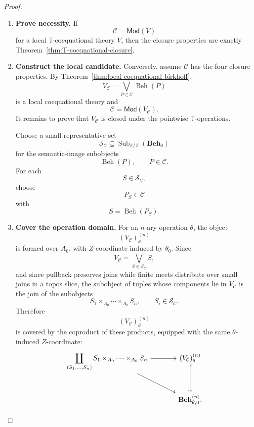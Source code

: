 \begin{proof}
    \leavevmode
    \begin{enumerate}
        \item \textbf{Prove necessity.}
        If
        \[
            \mathcal C=\mathsf{Mod}(V)
        \]
        for a local \(\mathbb T\)-coequational theory \(V\), then the closure
        properties are exactly Theorem~\ref{thm:T-coequational-closure}.

        \item \textbf{Construct the local candidate.}
        Conversely, assume \(\mathcal C\) has the four closure properties. By
        Theorem~\ref{thm:local-coequational-birkhoff},
        \[
            V_{\mathcal C}
            =
            \bigvee_{P\in\mathcal C}\operatorname{Beh}(P)
        \]
        is a local coequational theory and
        \[
            \mathcal C=\mathsf{Mod}(V_{\mathcal C}).
        \]
        It remains to prove that \(V_{\mathcal C}\) is closed under the
        pointwise \(\mathbb T\)-operations.

        Choose a small representative set
        \[
            \mathcal S_{\mathcal C}
            \subseteq
            \operatorname{Sub}_{\mathcal E/Z}(\mathbf{Beh}_0)
        \]
        for the semantic-image subobjects
        \[
            \operatorname{Beh}(P),
            \qquad
            P\in\mathcal C.
        \]
        For each
        \[
            S\in\mathcal S_{\mathcal C},
        \]
        choose
        \[
            P_S\in\mathcal C
        \]
        with
        \[
            S=\operatorname{Beh}(P_S).
        \]

        \item \textbf{Cover the operation domain.}
        For an \(n\)-ary operation \(\theta\), the object
        \[
            (V_{\mathcal C})^{(n)}_\theta
        \]
        is formed over \(A_0\), with \(Z\)-coordinate induced by \(\theta_0\).
        Since
        \[
            V_{\mathcal C}
            =
            \bigvee_{S\in\mathcal S_{\mathcal C}}S,
        \]
        and since pullback preserves joins while finite meets distribute over
        small joins in a topos slice, the subobject of tuples whose components
        lie in \(V_{\mathcal C}\) is the join of the subobjects
        \[
            S_1\times_{A_0}\cdots\times_{A_0}S_n,
            \qquad
            S_i\in\mathcal S_{\mathcal C}.
        \]
        Therefore
        \[
            (V_{\mathcal C})^{(n)}_\theta
        \]
        is covered by the coproduct of these products, equipped with the same
        \(\theta\)-induced \(Z\)-coordinate:
        \[
        \begin{tikzcd}[column sep=large, row sep=large]
            \displaystyle
            \coprod_{(S_1,\dots,S_n)}
            S_1\times_{A_0}\cdots\times_{A_0}S_n
                \arrow[r, two heads]
                \arrow[dr]
            &
            (V_{\mathcal C})^{(n)}_\theta
                \arrow[d, hook]
            \\
            &
            \mathbf{Beh}^{(n)}_{\theta,0}.
        \end{tikzcd}
        \]


\end{enumerate}
\end{proof}
